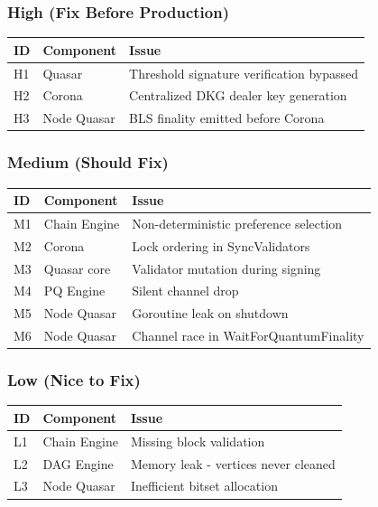 \documentclass[
]{article}
\newcounter{none} %
\begin{document}
\subsubsection{High (Fix Before
Production)}\label{high-fix-before-production}

{\def\LTcaptype{none} %
\begin{longtable}[]{@{}lll@{}}
\toprule\noalign{}
ID & Component & Issue \\
\midrule\noalign{}
\endhead
\bottomrule\noalign{}
\endlastfoot
H1 & Quasar & Threshold signature verification bypassed \\
H2 & Corona & Centralized DKG dealer key generation \\
H3 & Node Quasar & BLS finality emitted before Corona \\
\end{longtable}
}

\subsubsection{Medium (Should Fix)}\label{medium-should-fix}

{\def\LTcaptype{none} %
\begin{longtable}[]{@{}lll@{}}
\toprule\noalign{}
ID & Component & Issue \\
\midrule\noalign{}
\endhead
\bottomrule\noalign{}
\endlastfoot
M1 & Chain Engine & Non-deterministic preference selection \\
M2 & Corona & Lock ordering in SyncValidators \\
M3 & Quasar core & Validator mutation during signing \\
M4 & PQ Engine & Silent channel drop \\
M5 & Node Quasar & Goroutine leak on shutdown \\
M6 & Node Quasar & Channel race in WaitForQuantumFinality \\
\end{longtable}
}

\subsubsection{Low (Nice to Fix)}\label{low-nice-to-fix}

{\def\LTcaptype{none} %
\begin{longtable}[]{@{}lll@{}}
\toprule\noalign{}
ID & Component & Issue \\
\midrule\noalign{}
\endhead
\bottomrule\noalign{}
\endlastfoot
L1 & Chain Engine & Missing block validation \\
L2 & DAG Engine & Memory leak - vertices never cleaned \\
L3 & Node Quasar & Inefficient bitset allocation \\
\end{longtable}
}
\end{document}
